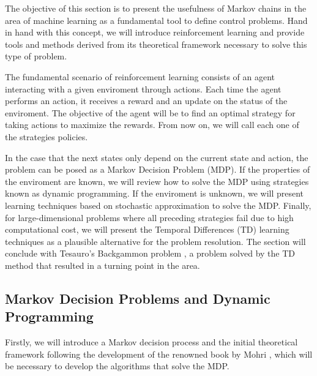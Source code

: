 \documentclass[12pt]{article}
\numberwithin{equation}{section}
\begin{document}
The objective of this section is to present the usefulness of Markov chains in the area of machine learning as a fundamental tool to define control problems. Hand in hand with this concept, we will introduce reinforcement learning and provide tools and methods derived from its theoretical framework necessary to solve this type of problem.

The fundamental scenario of reinforcement learning consists of an agent interacting with a given enviroment through actions. Each time the agent performs an action, it receives a reward and an update on the status of the enviroment. The objective of the agent will be to find an optimal strategy for taking actions to maximize the rewards. From now on, we will call each one of the strategies policies.

In the case that the next states only depend on the current state and action,  the problem can be posed as a Markov Decision Problem (MDP). If the properties of the enviroment are known, we will review how to solve the MDP using strategies known as dynamic programming. If the enviroment is unknown, we will present learning techniques based on stochastic approximation to solve the MDP. Finally, for large-dimensional problems where all preceding strategies fail due to high computational cost, we will present the Temporal Differences (TD) learning techniques as a plausible alternative for the problem resolution. The section will conclude with  Tesauro's Backgammon problem \cite{tesauro1992temporal} \cite{tesauro1994td},  a problem solved by the TD method that resulted in a turning point in the area.


\subsection{Markov Decision Problems and Dynamic Programming}

Firstly, we will introduce a Markov decision process and the initial theoretical framework following the development of the renowned book by Mohri \cite{mohri2018foundations}, which will be necessary to develop the algorithms that solve the MDP.
\end{document}

